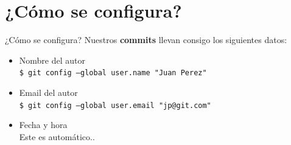 \documentclass{beamer}
\begin{document}
    \section{¿Cómo se configura?}
    \begin{frame}{¿Cómo se configura?}
        Nuestros \textbf{commits} llevan consigo los siguientes datos:\pause
        \begin{itemize}
            \item Nombre del autor\pause\\
            \texttt{\$ git config --global user.name "Juan Perez"}\pause
            \item Email del autor\pause\\
            \texttt{\$ git config --global user.email "jp@git.com"}\pause
            \item Fecha y hora\pause\\
            Este es automático..
        \end{itemize}
    \end{frame}
    
\end{document}
